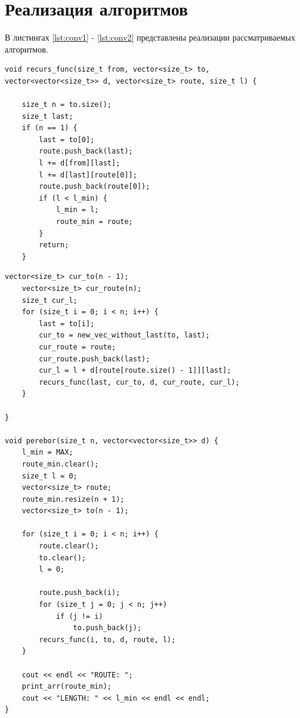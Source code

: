 \documentclass[a4paper,oneside,14pt]{extreport}
\begin{document}
\section{Реализация алгоритмов}
В листингах \ref{lst:conv1} - \ref{lst:conv2} представлены реализации рассматриваемых алгоритмов.
\captionsetup{singlelinecheck=false, justification=raggedright}
\begin{lstlisting}[label={lst:conv1},caption=Реализация алгоритма полного перебора (часть 1)]
void recurs_func(size_t from, vector<size_t> to, vector<vector<size_t>> d, vector<size_t> route, size_t l) {

	size_t n = to.size();
	size_t last;
	if (n == 1) {
		last = to[0];
		route.push_back(last);
		l += d[from][last];
		l += d[last][route[0]];
		route.push_back(route[0]);
		if (l < l_min) {
			l_min = l;
			route_min = route;
		}
		return;
	}
\end{lstlisting}
\newpage
\begin{lstlisting}[caption=Реализация алгоритма полного перебора (часть 2)]
	vector<size_t> cur_to(n - 1);
	vector<size_t> cur_route(n);
	size_t cur_l;
	for (size_t i = 0; i < n; i++) {
		last = to[i];
		cur_to = new_vec_without_last(to, last);
		cur_route = route;
		cur_route.push_back(last);
		cur_l = l + d[route[route.size() - 1]][last];
		recurs_func(last, cur_to, d, cur_route, cur_l);
	}

}

void perebor(size_t n, vector<vector<size_t>> d) {
	l_min = MAX;
	route_min.clear();
	size_t l = 0;
	vector<size_t> route;
	route_min.resize(n + 1);
	vector<size_t> to(n - 1);
	
	for (size_t i = 0; i < n; i++) {
		route.clear();
		to.clear();
		l = 0;
		
		route.push_back(i);
		for (size_t j = 0; j < n; j++)
			if (j != i)
				to.push_back(j);
		recurs_func(i, to, d, route, l);
	}
	
	cout << endl << "ROUTE: ";
	print_arr(route_min);
	cout << "LENGTH: " << l_min << endl << endl;
}
\end{lstlisting}
\newpage
\end{document}
